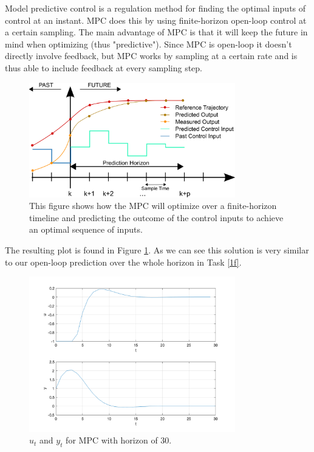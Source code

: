 \documentclass[11pt, a4paper, english]{NTNUoving}
\begin{document}
\begin{oppgave}

\begin{punkt}
Model predictive control is a regulation method for finding the optimal inputs of control at an instant. MPC does this by using finite-horizon open-loop control at a certain sampling.
The main advantage of MPC is that it will keep the future in mind when optimizing (thus "predictive"). Since MPC is open-loop it doesn't directly involve feedback, but MPC works by sampling at a certain rate and is thus able to
include feedback at every sampling step.

\begin{figure}[H]
    \centering
    \includegraphics[width=0.8\textwidth]{MPC_scheme_basic.png}
    \caption{This figure shows how the MPC will optimize over a finite-horizon timeline and predicting the outcome of the control inputs to achieve an optimal sequence of inputs.}
\end{figure}


\end{punkt}

\begin{punkt}
    The resulting plot is found in Figure \ref{fig:2b}. As we can see this solution is very similar to our open-loop prediction over the whole horizon in Task \ref{1f}.
    \begin{figure}[H]
        \centering
        \includegraphics[width=0.8\textwidth]{../2b.png}
        \caption{$u_t$ and $y_t$ for MPC with horizon of 30.}
        \label{fig:2b}
    \end{figure}
\end{punkt}


\end{oppgave}
\end{document}
